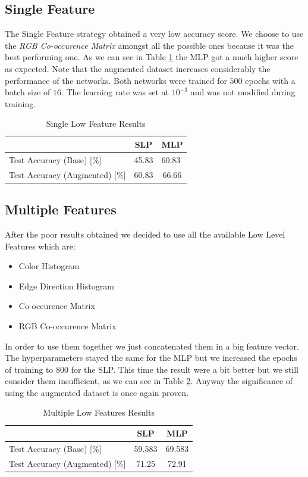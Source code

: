 \documentclass[10pt,a4paper]{report}
\begin{document}
\subsection{Single Feature}
The Single Feature strategy obtained a very low accuracy score. We choose to use the \textit{RGB Co-occurence Matrix} amongst all the possible ones because it was the best performing one. As we can see in Table \ref{tab:slf} the MLP got a much higher score as expected. Note that the augmented dataset increases considerably the performance of the networks. Both networks were trained for $500$ epochs with a batch size of $16$. The learning rate was set at $10^{-3}$ and was not modified during training.
\begin{table}[!ht]
\centering
\begin{tabular}{|l|c|c|}
\hline
                                   & SLP                        & MLP                        \\ \hline
Test Accuracy (Base) {[}\%{]}      & \multicolumn{1}{l|}{45.83} & \multicolumn{1}{l|}{60.83} \\ \hline
Test Accuracy (Augmented) {[}\%{]} & 60.83                      & 66.66                      \\ \hline
\end{tabular}
\caption{Single Low Feature Results}
\label{tab:slf}
\end{table}
\subsection{Multiple Features}
After the poor results obtained we decided to use all the available Low Level Features which are:
\begin{itemize}
\item Color Histogram
\item Edge Direction Histogram
\item Co-occurence Matrix
\item RGB Co-occurence Matrix
\end{itemize}
In order to use them together we just concatenated them in a big feature vector. The hyperparameters stayed the same for the MLP but we increased the epochs of training to $800$ for the SLP. This time the result were a bit better but we still consider them insufficient, as we can see in Table \ref{tab:mlf}. Anyway the significance of using the augmented dataset is once again proven.
\begin{table}[!ht]
\centering
\begin{tabular}{|l|c|c|}
\hline
                                   & SLP                         & MLP                         \\ \hline
Test Accuracy (Base) {[}\%{]}      & \multicolumn{1}{l|}{59.583} & \multicolumn{1}{l|}{69.583} \\ \hline
Test Accuracy (Augmented) {[}\%{]} & 71.25                       & 72.91                       \\ \hline
\end{tabular}
\caption{Multiple Low Features Results}
\label{tab:mlf}
\end{table}
\end{document}
